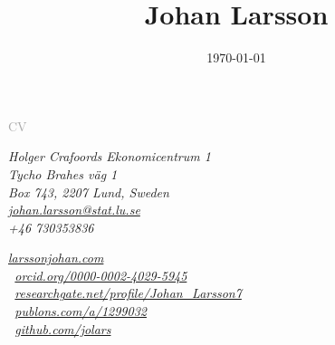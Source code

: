 \documentclass[
  10pt,
  headsepline=true,
  english,
  DIV=12
]{scrartcl}
\date{\today}
\title{Johan Larsson}
\renewcommand*{%
  \mkbibnamegiven
}[1]{\ifitemannotation{highlight}{\textbf{#1}}{#1}}
\renewcommand*{%
  \mkbibnamefamily
}[1]{\ifitemannotation{highlight}{\textbf{#1}}{#1}}
\begin{document}
\begin{titlepage}
\end{titlepage}

\begin{center}
  {\large \textcolor{darkgray}{CV}}
  \medskip

  \smallskip

  \noindent {\large \today}
\end{center}

\baselineskip

\begin{minipage}[t]{.5\textwidth}
  \small
  \itshape
  \noindent
  Holger Crafoords Ekonomicentrum 1\\
  Tycho Brahes väg 1\\
  Box 743, 2207 Lund, Sweden
  \vspace{1ex}\\
  \href{mailto:johan.larsson@stat.lu.se}{johan.larsson@stat.lu.se}\\
  +46 730353836

\end{minipage}%
\begin{minipage}[t]{0.5\textwidth}
  \raggedleft\itshape\small
  \href{https://larssonjohan.com}{larssonjohan.com}\\
  {\aiOrcid}\,
  \href{https://orcid.org/0000-0002-4029-5945}{orcid.org/0000-0002-4029-5945}\\
  {\aiResearchGate}\,
  \href{https://www.researchgate.net/profile/Johan_Larsson7}{researchgate.net/profile/Johan\_Larsson7}\\
  {\aiPublons}\, \href{https://publons.com/a/1299032}{publons.com/a/1299032}\\
  {\faGithub}\, \href{https://github.com/jolars}{github.com/jolars}
\end{minipage}

\end{document}
